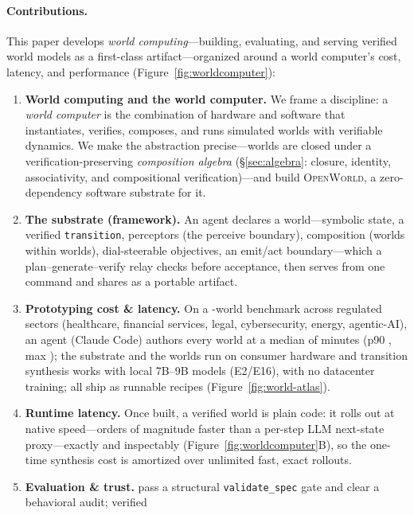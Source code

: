 \documentclass[11pt]{article}
\newcommand{\openworld}{\textsc{OpenWorld}}
\begin{document}
\paragraph{Contributions.} This paper develops \emph{world computing}---building, evaluating,
and serving verified world models as a first-class artifact---organized around a world
computer's cost, latency, and performance (Figure~\ref{fig:worldcomputer}):
\begin{enumerate}
  \item \textbf{World computing and the world computer.} We frame a discipline: a \emph{world
  computer} is the combination of hardware and software that instantiates, verifies, composes,
  and runs simulated worlds with verifiable dynamics. We make the abstraction precise---worlds are
  closed under a verification-preserving \emph{composition algebra} (\S\ref{sec:algebra}: closure,
  identity, associativity, and compositional verification)---and build \openworld, a
  zero-dependency software substrate for it.
  \item \textbf{The substrate (framework).} An agent declares a
  world---symbolic state, a verified \texttt{transition}, perceptors (the perceive boundary),
  composition (worlds within worlds), dial-steerable objectives, an emit/act boundary---which a
  plan--generate--verify relay checks before acceptance, then serves from one command and shares
  as a portable artifact.
  \item \textbf{Prototyping cost \& latency.} On a \ProtoNumWorlds-world benchmark across
  \ProtoNumSectors{} regulated sectors (healthcare, financial services, legal, cybersecurity,
  energy, agentic-AI), an agent (Claude Code) authors every world at a median of \ProtoMedianMinutes{} minutes
  (p90 \ProtoPNinetyMinutes, max \ProtoMaxMinutes); the substrate and the worlds run on consumer
  hardware and transition synthesis works with local 7B--9B models (E2/E16), with no datacenter
  training; all \ProtoNumWorlds{} ship as runnable recipes (Figure~\ref{fig:world-atlas}).
  \item \textbf{Runtime latency.} Once built, a verified world is plain code: it rolls out at
  native speed---orders of magnitude faster than a per-step LLM next-state proxy---exactly and
  inspectably (Figure~\ref{fig:worldcomputer}B), so the one-time synthesis cost is amortized over
  unlimited fast, exact rollouts.
  \item \textbf{Evaluation \& trust.} \ProtoValidationRate{} pass a structural
  \texttt{validate\_spec} gate and \ProtoExecutableRate{} clear a behavioral audit; verified

\end{enumerate}
\end{document}
